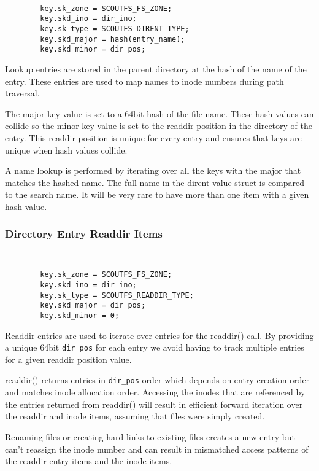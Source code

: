 \documentclass[letterpaper,twocolumn,10pt]{article}
\begin{document}
{\tt \small
\begin{verbatim}
        key.sk_zone = SCOUTFS_FS_ZONE;
        key.skd_ino = dir_ino;
        key.sk_type = SCOUTFS_DIRENT_TYPE;
        key.skd_major = hash(entry_name);
        key.skd_minor = dir_pos;
\end{verbatim}
}

Lookup entries are stored in the parent directory at the hash of the
name of the entry.  These entries are used to map names to inode numbers
during path traversal.

The major key value is set to a 64bit hash of the file name.  These hash
values can collide so the minor key value is set to the readdir position
in the directory of the entry.  This readdir position is unique for
every entry and ensures that keys are unique when hash values collide.

A name lookup is performed by iterating over all the keys with the major
that matches the hashed name.  The full name in the dirent value struct
is compared to the search name.  It will be very rare to have more than
one item with a given hash value.

\subsubsection{Directory Entry Readdir Items}

{\tt \small
\begin{verbatim}
        key.sk_zone = SCOUTFS_FS_ZONE;
        key.skd_ino = dir_ino;
        key.sk_type = SCOUTFS_READDIR_TYPE;
        key.skd_major = dir_pos;
        key.skd_minor = 0;
\end{verbatim}
}

Readdir entries are used to iterate over entries for the readdir()
call.  By providing a unique 64bit {\tt dir\_pos} for each entry we avoid
having to track multiple entries for a given readdir position value.

readdir() returns entries in {\tt dir\_pos} order which depends on entry
creation order and matches inode allocation order.  Accessing the inodes
that are referenced by the entries returned from readdir() will result
in efficient forward iteration over the readdir and inode items,
assuming that files were simply created.

Renaming files or creating hard links to existing files creates a new
entry but can't reassign the inode number and can result in mismatched
access patterns of the readdir entry items and the inode items.
\end{document}
